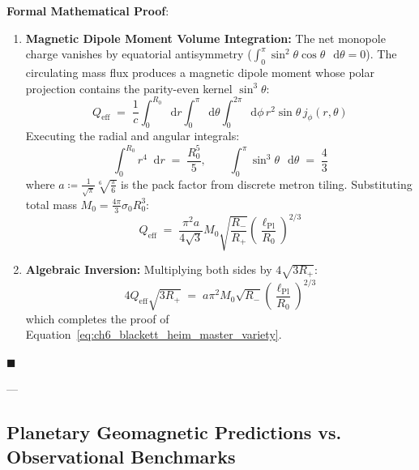 \documentclass[
    12pt,
    a4paper,
    headings=normal,
    twoside=false,
    open=any,
    parskip=half
]{scrbook}
\newcommand{\diff}{\mathop{}\!\mathrm{d}}
\newenvironment{myproof}[1][]{%
  \par\vspace{6pt}\noindent\textbf{\sffamily\color{maincolor}Formal Mathematical Proof\ifstrempty{#1}{}{ (#1)}}:\par\nopagebreak
}{%
  \penalty50\hfill\ensuremath{\blacksquare}\par\vspace{6pt}
}
\begin{document}
\begin{myproof}
\begin{enumerate}[label=\textbf{Stage \arabic*:}, leftmargin=2.2em]
    \item \textbf{Magnetic Dipole Moment Volume Integration:}  
    The net monopole charge vanishes by equatorial antisymmetry ($\int_0^\pi \sin^2\theta\cos\theta\,\diff\theta = 0$). The circulating mass flux produces a magnetic dipole moment whose polar projection contains the parity-even kernel $\sin^3\theta$:
    \begin{equation*}
    Q_{\text{eff}} \;=\; \frac{1}{c} \int_0^{R_0} \diff r \int_0^\pi \diff\theta \int_0^{2\pi} \diff\phi \, r^2 \sin\theta \, j_\phi(r, \theta)
    \end{equation*}
    Executing the radial and angular integrals:
    \begin{equation*}
    \int_0^{R_0} r^4 \diff r \;=\; \frac{R_0^5}{5}, \qquad \int_0^\pi \sin^3\theta\,\diff\theta \;=\; \frac{4}{3}
    \end{equation*}
    where $a \coloneqq \frac{1}{\sqrt{\pi}}\sqrt[6]{\frac{\pi}{6}}$ is the pack factor from discrete metron tiling. Substituting total mass $M_0 = \frac{4\pi}{3}\sigma_0 R_0^3$:
    \begin{equation*}
    Q_{\text{eff}} \;=\; \frac{\pi^2 a}{4\sqrt{3}} M_0 \sqrt{\frac{R_-}{R_+}} \left(\frac{\ell_{\text{Pl}}}{R_0}\right)^{2/3}
    \end{equation*}

    \item \textbf{Algebraic Inversion:}  
    Multiplying both sides by $4\sqrt{3R_+}$:
    \begin{equation*}
    4 Q_{\text{eff}} \sqrt{3 R_+} \;=\; a \pi^2 M_0 \sqrt{R_-} \left(\frac{\ell_{\text{Pl}}}{R_0}\right)^{2/3}
    \end{equation*}
    which completes the proof of Equation~\eqref{eq:ch6_blackett_heim_master_variety}.
\end{enumerate}
\end{myproof}

---

\subsection{Planetary Geomagnetic Predictions vs. Observational Benchmarks}
\end{document}
